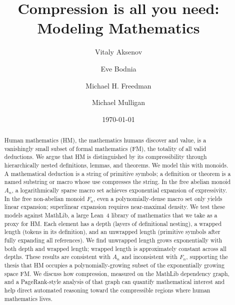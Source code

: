 \documentclass[12pt]{amsart}
\theoremstyle{definition}
\theoremstyle{remark}
\begin{document}
\title{Compression is all you need: Modeling Mathematics}
\date{\today}
\author{Vitaly Aksenov}
\address{\hspace{-\parindent}Vitaly Aksenov, Logical Intelligence}

\author{Eve Bodnia}
\address{\hspace{-\parindent}Eve Bodnia, Logical Intelligence}

\author{Michael H. Freedman}
\address{\hspace{-\parindent}Michael H. Freedman, Logical Intelligence; Center of Mathematical Sciences and Applications, Harvard University, Cambridge, MA 02138, USA}

\author{Michael Mulligan}
\address{\hspace{-\parindent}Michael Mulligan, Logical Intelligence; Department of Physics and Astronomy, University of California, Riverside, CA 92521, USA}


\maketitle


\begin{abstract}
Human mathematics (HM), the mathematics humans discover and value, is a vanishingly small subset of formal mathematics (FM), the totality of all valid deductions.
We argue that HM is distinguished by its compressibility through hierarchically nested definitions, lemmas, and theorems.
We model this with monoids.
A mathematical deduction is a string of primitive symbols; a definition or theorem is a named substring or macro whose use compresses the string.
In the free abelian monoid $A_n$, a logarithmically sparse macro set achieves exponential expansion of expressivity.
In the free non-abelian monoid $F_n$, even a polynomially-dense macro set only yields linear expansion; superlinear expansion requires near-maximal density.
We test these models against MathLib, a large Lean~4 library of mathematics that we take as a proxy for HM.
Each element has a depth (layers of definitional nesting), a wrapped length (tokens in its definition), and an unwrapped length (primitive symbols after fully expanding all references).
We find unwrapped length grows exponentially with both depth and wrapped length; wrapped length is approximately constant across all depths.
These results are consistent with $A_n$ and inconsistent with $F_n$, supporting the thesis that HM occupies a polynomially-growing subset of the exponentially growing space FM.
We discuss how compression, measured on the MathLib dependency graph, and a PageRank-style analysis of that graph can quantify mathematical interest and help direct automated reasoning toward the compressible regions where human mathematics lives.
\end{abstract}
\end{document}
